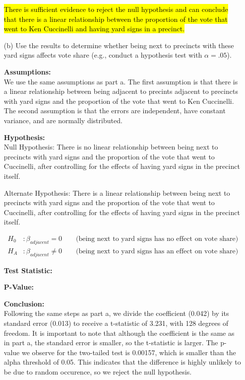 \documentclass[12pt,letterpaper]{article}
\begin{document}
\begin{enumerate}
	\hl{There is sufficient evidence to reject the null hypothesis and can conclude that there is a linear relationship between the proportion of the vote that went to Ken Cuccinelli and having yard signs in a precinct.}
	
	\item [(b)]  Use the results to determine whether being
	next to precincts with these yard signs affects vote
	share (e.g., conduct a hypothesis test with $\alpha = .05$).
	
	\textbf{Assumptions:}\\
	We use the same assumptions as part a. The first assumption is that there is a linear relationship between being adjacent to precints adjacent to precincts with yard signs and the proportion of the vote that went to Ken Cuccinelli. The second assumption is that the errors are independent, have constant variance, and are normally distributed. 
	
	\textbf{Hypothesis:}\\
	Null Hypothesis: There is no linear relationship between being next to precincts with yard signs and the proportion of the vote that went to Cuccinelli, after controlling for the effects of having yard signs in the precinct itself. 
	
	Alternate Hypothesis: There is a linear relationship between being next to precincts with yard signs and the proportion of the vote that went to Cuccinelli, after controlling for the effects of having yard signs in the precinct itself. 
	
	\begin{align*}
		H_0&: \beta_{adjacent} = 0 \qquad \text{(being next to yard signs has no effect on vote share)}\\
		H_A&: \beta_{adjacent} \neq 0 \qquad \text{(being next to yard signs has an effect on vote share)}
	\end{align*}
	
	\textbf{Test Statistic:}
	
	
	\textbf{P-Value:}
	
	
	\textbf{Conclusion:}\\
	Following the same steps as part a, we divide the coefficient (0.042) by its standard error (0.013) to receive a t-statistic of 3.231, with 128 degrees of freedom. It is important to note that although the coefficient is the same as in part a, the standard error is smaller, so the t-statistic is larger. The p-value we observe for the two-tailed test is 0.00157, which is smaller than the alpha threshold of 0.05. This indicates that the difference is highly unlikely to be due to random occurence, so we reject the null hypothesis.
	

\end{enumerate}
\end{document}
